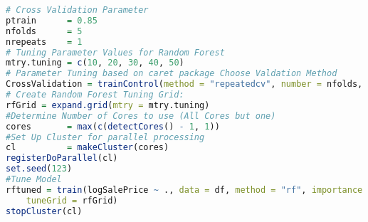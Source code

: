 \begin{lstlisting}[language=R]
# Cross Validation Parameter
ptrain      = 0.85
nfolds      = 5
nrepeats    = 1
# Tuning Parameter Values for Random Forest
mtry.tuning = c(10, 20, 30, 40, 50)
# Parameter Tuning based on caret package Choose Valdation Method
CrossValidation = trainControl(method = "repeatedcv", number = nfolds, p = ptrain, repeats = nrepeats)
# Create Random Forest Tuning Grid:
rfGrid = expand.grid(mtry = mtry.tuning)
#Determine Number of Cores to use (All Cores but one)
cores       = max(c(detectCores() - 1, 1))
#Set Up Cluster for parallel processing
cl          = makeCluster(cores)
registerDoParallel(cl)
set.seed(123)
#Tune Model
rftuned = train(logSalePrice ~ ., data = df, method = "rf", importance = TRUE, trControl = CrossValidation, verbose = TRUE, 
    tuneGrid = rfGrid)
stopCluster(cl)
\end{lstlisting}